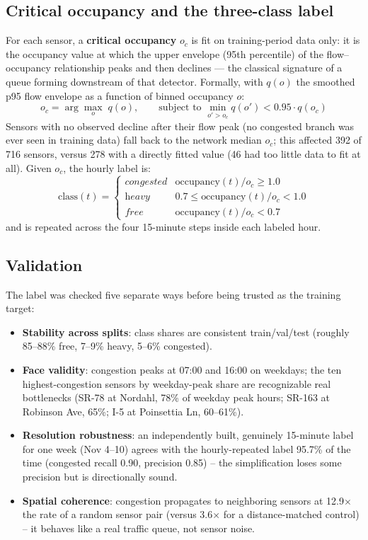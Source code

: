 \documentclass[11pt]{article}
\begin{document}
\subsection{Critical occupancy and the three-class label}
For each sensor, a \textbf{critical occupancy} $o_c$ is fit on training-period data only: it is
the occupancy value at which the upper envelope (95th percentile) of the flow--occupancy
relationship peaks and then declines --- the classical signature of a queue forming downstream of
that detector. Formally, with $q(o)$ the smoothed p95 flow envelope as a function of binned
occupancy $o$:
\begin{equation}
o_c = \arg\max_{o} \; q(o), \qquad \text{subject to } \min_{o' > o_c} q(o') < 0.95 \cdot q(o_c)
\end{equation}
Sensors with no observed decline after their flow peak (no congested branch was ever seen in
training data) fall back to the network median $o_c$; this affected 392 of 716 sensors, versus
278 with a directly fitted value (46 had too little data to fit at all). Given $o_c$, the hourly
label is:
\begin{equation}
\text{class}(t) = \begin{cases} \textit{congested} & \text{occupancy}(t) / o_c \ge 1.0 \\ \textit{heavy} & 0.7 \le \text{occupancy}(t)/o_c < 1.0 \\ \textit{free} & \text{occupancy}(t)/o_c < 0.7 \end{cases}
\end{equation}
and is repeated across the four 15-minute steps inside each labeled hour.

\subsection{Validation}
The label was checked five separate ways before being trusted as the training target:
\begin{itemize}
\item \textbf{Stability across splits}: class shares are consistent train/val/test (roughly
  85--88\% free, 7--9\% heavy, 5--6\% congested).
\item \textbf{Face validity}: congestion peaks at 07:00 and 16:00 on weekdays; the ten
  highest-congestion sensors by weekday-peak share are recognizable real bottlenecks (SR-78 at
  Nordahl, 78\% of weekday peak hours; SR-163 at Robinson Ave, 65\%; I-5 at Poinsettia Ln,
  60--61\%).
\item \textbf{Resolution robustness}: an independently built, genuinely 15-minute label for one
  week (Nov 4--10) agrees with the hourly-repeated label 95.7\% of the time (congested recall
  0.90, precision 0.85) -- the simplification loses some precision but is directionally sound.
\item \textbf{Spatial coherence}: congestion propagates to neighboring sensors at 12.9$\times$ the
  rate of a random sensor pair (versus 3.6$\times$ for a distance-matched control) -- it behaves
  like a real traffic queue, not sensor noise.
\end{itemize}
\end{document}
